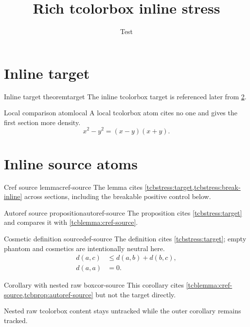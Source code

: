 \documentclass{article}
\title{Rich tcolorbox inline stress}
\author{Test}
\date{}
\begin{document}
\START
\maketitle

\section{Inline target}
\label{sec:tcb-inline-target}

\begin{tcbstress}{Inline target theorem}{target}
The inline tcolorbox target is referenced later from \cref{sec:tcb-inline-sources}.
\end{tcbstress}

\begin{tcbfree}{Local comparison atom}{local}
A local tcolorbox atom cites no one and gives the first section more density.
\begin{equation}\label{eq:tcb-inline-local}
  x^2-y^2=(x-y)(x+y).
\end{equation}
\end{tcbfree}

\section{Inline source atoms}
\label{sec:tcb-inline-sources}

\begin{tcblemma}{Cref source lemma}{cref-source}
The lemma cites \cref{tcbstress:target,tcbstress:break-inline} across sections, including the breakable positive control below.
\end{tcblemma}

\begin{tcbprop}{Autoref source proposition}{autoref-source}
The proposition cites \autoref{tcbstress:target} and compares it with \cref{tcblemma:cref-source}.
\end{tcbprop}

\begin{tcbdef}[phantom={},colback=purple!5,colframe=purple!65!black]{Cosmetic definition source}{def-source}
The definition cites \cref{tcbstress:target}; empty phantom and cosmetics are intentionally neutral here.
\begin{align}
  d(a,c) &\le d(a,b)+d(b,c),\\
  d(a,a) &= 0.
\end{align}
\end{tcbdef}

\begin{tcbcor}{Corollary with nested raw box}{cor-source}
This corollary cites \cref{tcblemma:cref-source,tcbprop:autoref-source} but not the target directly.
\begin{innerplain}
Nested raw tcolorbox content stays untracked while the outer corollary remains tracked.
\end{innerplain}
\end{tcbcor}
\end{document}
